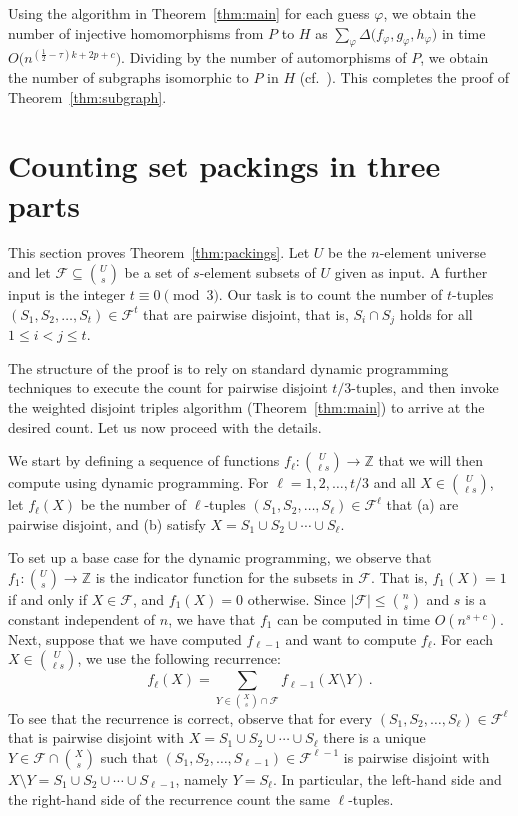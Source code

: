 \documentclass{amsart}
\begin{document}
Using the algorithm in Theorem~\ref{thm:main} for each guess $\varphi$, 
we obtain the number of injective homomorphisms from $P$ to $H$ as 
$\sum_{\varphi} \Delta\bigl(f_\varphi,g_\varphi,h_\varphi\bigr)$ in time
$O\bigl(n^{(\frac{1}{2}-\tau)k+2p+c}\bigr)$. Dividing by the number
of automorphisms of $P$, we obtain the number of subgraphs isomorphic 
to $P$ in $H$ (cf.~\cite[Theorem~2]{FLRRS12}). This completes the proof of 
Theorem~\ref{thm:subgraph}. 



\section{Counting set packings in three parts}
\label{sect:packings-in-three-parts}

This section proves Theorem~\ref{thm:packings}. 
Let $U$ be the $n$-element universe and let 
$\mathcal{F}\subseteq\binom{U}{s}$ be a set of $s$-element subsets of $U$
given as input. A further input is the integer $t\equiv 0\pmod 3$.
Our task is to count the number of 
$t$-tuples $(S_1,S_2,\ldots,S_t)\in\mathcal{F}^t$ that
are pairwise disjoint, that is, $S_i\cap S_j$ holds for all 
$1\leq i<j\leq t$.

The structure of the proof is to rely on standard dynamic programming 
techniques to execute the count for pairwise disjoint $t/3$-tuples, and 
then invoke the weighted disjoint triples algorithm (Theorem~\ref{thm:main}) 
to arrive at the desired count. Let us now proceed with the details.

We start by defining a sequence of functions 
$f_\ell:\binom{U}{\ell s}\rightarrow\mathbb{Z}$ that we will
then compute using dynamic programming.
For $\ell=1,2,\ldots,t/3$ and all $X\in\binom{U}{\ell s}$, let
$f_\ell(X)$ be the number of $\ell$-tuples 
$(S_1,S_2,\ldots,S_\ell)\in\mathcal{F}^\ell$ that (a) are pairwise disjoint,
and (b) satisfy $X=S_1\cup S_2\cup\cdots\cup S_\ell$.

To set up a base case for the dynamic programming, we observe 
that $f_1:\binom{U}{s}\rightarrow\mathbb{Z}$ is the indicator function 
for the subsets in $\mathcal{F}$. That is, $f_1(X)=1$ if and only if
$X\in\mathcal{F}$, and $f_1(X)=0$ otherwise. Since 
$|\mathcal{F}|\leq\binom{n}{s}$ and $s$ is a constant independent of $n$, 
we have that $f_1$ can be computed in time $O(n^{s+c})$.
Next, suppose that we have computed $f_{\ell-1}$ and want to
compute $f_{\ell}$. For each $X\in\binom{U}{\ell s}$, we use the 
following recurrence:
\[
f_\ell(X)=\sum_{Y\in\binom{X}{s}\cap\mathcal{F}}f_{\ell-1}(X\setminus Y)\,.
\]
To see that the recurrence is correct, observe that 
for every $(S_1,S_2,\ldots,S_\ell)\in\mathcal{F}^\ell$
that is pairwise disjoint with $X=S_1\cup S_2\cup\cdots\cup S_\ell$
there is a unique $Y\in\mathcal{F}\cap\binom{X}{s}$ such that
$(S_1,S_2,\ldots,S_{\ell-1})\in\mathcal{F}^{\ell-1}$
is pairwise disjoint with 
$X\setminus Y=S_1\cup S_2\cup\cdots\cup S_{\ell-1}$, namely $Y=S_{\ell}$.
In particular, the left-hand side and the right-hand side of the 
recurrence count the same $\ell$-tuples. 
\end{document}
